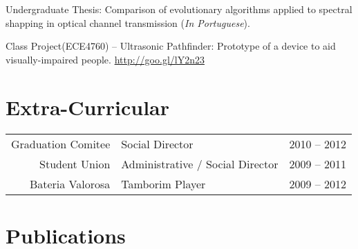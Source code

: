 \documentclass[]{deedy-resume-openfont}
\begin{document}
\begin{minipage}[t]{0.66\textwidth}
\descript{ }
\begin{tightemize}
	\item Undergraduate Thesis: Comparison of evolutionary algorithms applied to spectral shapping in optical channel transmission (\textit{In Portuguese}).
	\item Class Project(ECE4760) – Ultrasonic Pathfinder: Prototype of a device to aid visually-impaired people. \href{http://goo.gl/lY2n23} {http://goo.gl/lY2n23}
	
	
	
\end{tightemize}
\sectionsep


\section{Extra-Curricular} 
\begin{tabular}{rll}
Graduation Comitee  & Social Director &2010 – 2012	      \\
Student Union & Administrative / Social   Director &2009 – 2011 \\
Bateria Valorosa &Tamborim Player  & 2009 – 2012 \\
\end{tabular}

\sectionsep


\section{Publications} 
\renewcommand\refname{\vskip -1.5cm} %
\vskip 1cm
\footnotesize


\nocite{*}

\end{minipage} 
\end{document}
